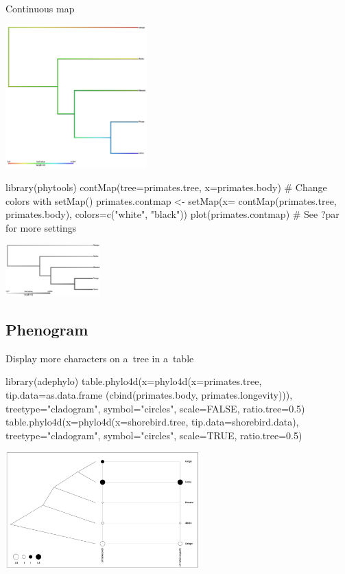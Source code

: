 \documentclass[compress, ucs, xelatex, 11pt, xcolor=svgnames,
	hyperref={
		bookmarks=true,
		unicode=true,
		colorlinks=true,
		pdftitle={Molecular data in R},
		plainpages=false,
		pdfauthor={Vojtech Zeisek},
		pdfsubject={Course about phylogeny and evolution in R},
		pdfcreator={XeLaTeX},
		pdfkeywords={R, evolution, phylogeny, molecular data},
		linkcolor=Tomato,
		anchorcolor=SaddleBrown,
		citecolor=Goldenrod,
		filecolor=DarkMagenta,
		menucolor=Sienna,
		urlcolor=DarkTurquoise,
		pdftex},
	url={hyphens, lowtilde} %
	]{beamer}
\begin{document}
\begin{frame}[fragile]{Continuous map}
	\begin{multicols}{2}
		\vfill
		\begin{center}
			\includegraphics[height=5.5cm]{contmap.png}
		\end{center}
		\vfill
		\begin{spluscode}
    library(phytools)
    contMap(tree=primates.tree,
      x=primates.body)
    # Change colors with setMap()
    primates.contmap <- setMap(x=
      contMap(primates.tree,
      primates.body),
      colors=c("white", "black"))
    plot(primates.contmap)
    # See ?par for more settings
		\end{spluscode}
		\vfill
		\begin{center}
			\includegraphics[height=2cm]{contmapbw.png}
		\end{center}
		\vfill
	\end{multicols}
\end{frame}

\subsection{Phenogram}

\begin{frame}[fragile]{Display more characters on a~tree in a~table}
	\begin{spluscode}
    library(adephylo)
    table.phylo4d(x=phylo4d(x=primates.tree, tip.data=as.data.frame
      (cbind(primates.body, primates.longevity))), treetype="cladogram",
      symbol="circles", scale=FALSE, ratio.tree=0.5)
    table.phylo4d(x=phylo4d(x=shorebird.tree, tip.data=shorebird.data),
      treetype="cladogram", symbol="circles", scale=TRUE, ratio.tree=0.5)
	\end{spluscode}
	\begin{center}
		\includegraphics[height=4.5cm]{phylotable.png}
	\end{center}
\end{frame}
\end{document}
